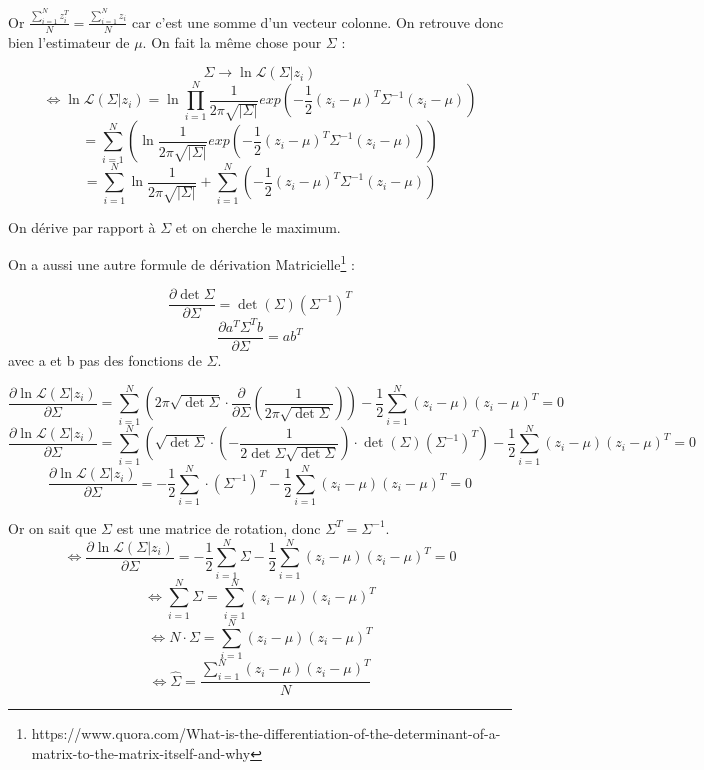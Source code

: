 \documentclass{article}
\begin{document}
Or $\frac{\sum_{i=1}^{N}z_i^{T}}{N} = \frac{\sum_{i=1}^{N}z_i}{N}$ car c'est une somme d'un vecteur colonne.
On retrouve donc bien l'estimateur de $\mu$.
On fait la même chose pour $\Sigma$ :

$$\Sigma \rightarrow \ln \mathcal{L}(\Sigma | z_i)$$
$$\Leftrightarrow \ln \mathcal{L}(\Sigma | z_i)=\ln \prod_{i=1}^{N} \frac{1}{2\pi\sqrt{|\Sigma|}}exp(-\frac{1}{2}(z_i-\mu)^{T}\Sigma^{-1}(z_i-\mu))$$
$$= \sum_{i=1}^{N} (\ln \frac{1}{2\pi\sqrt{|\Sigma|}}exp(-\frac{1}{2}(z_i-\mu)^{T}\Sigma^{-1}(z_i-\mu)))$$
$$= \sum_{i=1}^{N}\ln \frac{1}{2\pi\sqrt{|\Sigma|}} + \sum_{i=1}^{N}(-\frac{1}{2}(z_i-\mu)^{T}\Sigma^{-1}(z_i-\mu))$$

On dérive par rapport à $\Sigma$ et on cherche le maximum.

On a aussi une autre formule de dérivation Matricielle\footnote{https://www.quora.com/What-is-the-differentiation-of-the-determinant-of-a-matrix-to-the-matrix-itself-and-why} :

$$\frac{\partial \det\Sigma}{\partial \Sigma} = \det(\Sigma)(\Sigma^{-1})^{T}$$
$$\frac{\partial a^{T}\Sigma^{T}b}{\partial \Sigma} = ab^{T}$$
avec a et b pas des fonctions de $\Sigma$.

$$\frac{\partial \ln \mathcal{L}(\Sigma | z_i)}{\partial \Sigma}=\sum_{i=1}^{N}(2\pi\sqrt{\det\Sigma}\cdot\frac{\partial }{\partial \Sigma}(\frac{1}{2\pi\sqrt{\det \Sigma}}))-\frac{1}{2}\sum_{i=1}^{N}(z_i-\mu)(z_i-\mu)^{T}=0$$
$$\frac{\partial \ln \mathcal{L}(\Sigma | z_i)}{\partial \Sigma}=\sum_{i=1}^{N}(\sqrt{\det\Sigma}\cdot(-\frac{1}{2\det\Sigma \sqrt{\det \Sigma}})\cdot\det(\Sigma)(\Sigma^{-1})^{T})-\frac{1}{2}\sum_{i=1}^{N}(z_i-\mu)(z_i-\mu)^{T}=0$$
$$\frac{\partial \ln \mathcal{L}(\Sigma | z_i)}{\partial \Sigma}=-\frac{1}{2}\sum_{i=1}^{N}\cdot(\Sigma^{-1})^{T}-\frac{1}{2}\sum_{i=1}^{N}(z_i-\mu)(z_i-\mu)^{T}=0$$

Or on sait que $\Sigma$ est une matrice de rotation, donc $\Sigma^{T}=\Sigma^{-1}$.
$$\Leftrightarrow \frac{\partial \ln \mathcal{L}(\Sigma | z_i)}{\partial \Sigma}=-\frac{1}{2}\sum_{i=1}^{N}\Sigma-\frac{1}{2}\sum_{i=1}^{N}(z_i-\mu)(z_i-\mu)^{T}=0$$
$$\Leftrightarrow \sum_{i=1}^{N}\Sigma=\sum_{i=1}^{N}(z_i-\mu)(z_i-\mu)^{T}$$
$$\Leftrightarrow N\cdot\Sigma=\sum_{i=1}^{N}(z_i-\mu)(z_i-\mu)^{T}$$
$$\Leftrightarrow \hat{\Sigma}=\frac{\sum_{i=1}^{N}(z_i-\mu)(z_i-\mu)^{T}}{N}$$
\end{document}
